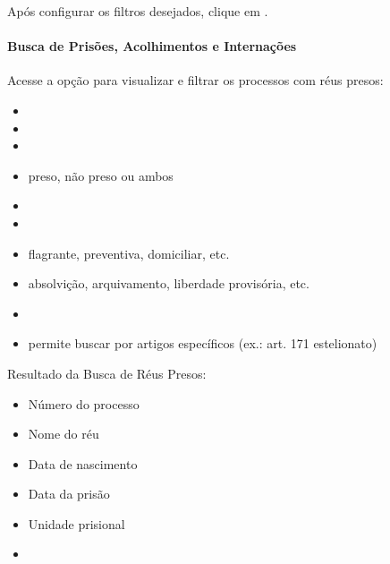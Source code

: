 \documentclass[letterpaper,10pt,brazil]{sphinxmanual}
\begin{document}
\sphinxAtStartPar
Após configurar os filtros desejados, clique em .


\paragraph{Busca de Prisões, Acolhimentos e Internações}
\label{\detokenize{projud_43_buscarelacaoreupreso:busca-de-prisoes-acolhimentos-e-internacoes}}
\sphinxAtStartPar
Acesse a opção  para visualizar e filtrar os processos com réus presos:
\begin{itemize}
\item {} 
\sphinxAtStartPar
{}

\item {} 
\sphinxAtStartPar
{}

\item {} 
\sphinxAtStartPar
{}

\item {} 
\sphinxAtStartPar
{} preso, não preso ou ambos

\item {} 
\sphinxAtStartPar
{}

\item {} 
\sphinxAtStartPar
{}

\item {} 
\sphinxAtStartPar
{} flagrante, preventiva, domiciliar, etc.

\item {} 
\sphinxAtStartPar
{} absolvição, arquivamento, liberdade provisória, etc.

\item {} 
\sphinxAtStartPar
{}

\item {} 
\sphinxAtStartPar
{} permite buscar por artigos específicos (ex.: art. 171 \sphinxhyphen{} estelionato)

\end{itemize}

\sphinxAtStartPar
Resultado da Busca de Réus Presos:
\begin{itemize}
\item {} 
\sphinxAtStartPar
Número do processo

\item {} 
\sphinxAtStartPar
Nome do réu

\item {} 
\sphinxAtStartPar
Data de nascimento

\item {} 
\sphinxAtStartPar
Data da prisão

\item {} 
\sphinxAtStartPar
Unidade prisional

\item {} 
\sphinxAtStartPar
{}

\end{itemize}
\end{document}
